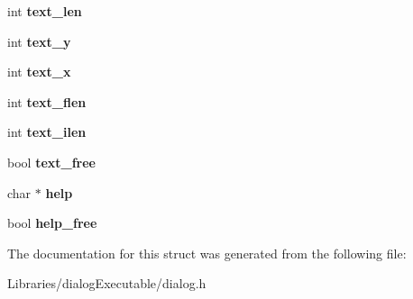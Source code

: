 \begin{DoxyCompactItemize}
\item 
int {\bfseries text\+\_\+len}\hypertarget{struct_d_i_a_l_o_g___f_o_r_m_i_t_e_m_a0e112e1cc3d865c15ebdc427cae71762}{}\label{struct_d_i_a_l_o_g___f_o_r_m_i_t_e_m_a0e112e1cc3d865c15ebdc427cae71762}

\item 
int {\bfseries text\+\_\+y}\hypertarget{struct_d_i_a_l_o_g___f_o_r_m_i_t_e_m_a95d22fda88099224259f545d80e4e87a}{}\label{struct_d_i_a_l_o_g___f_o_r_m_i_t_e_m_a95d22fda88099224259f545d80e4e87a}

\item 
int {\bfseries text\+\_\+x}\hypertarget{struct_d_i_a_l_o_g___f_o_r_m_i_t_e_m_a8341a3902620a26450745b718cfb738c}{}\label{struct_d_i_a_l_o_g___f_o_r_m_i_t_e_m_a8341a3902620a26450745b718cfb738c}

\item 
int {\bfseries text\+\_\+flen}\hypertarget{struct_d_i_a_l_o_g___f_o_r_m_i_t_e_m_a98bec5d330f043b6b9e28a07aa527432}{}\label{struct_d_i_a_l_o_g___f_o_r_m_i_t_e_m_a98bec5d330f043b6b9e28a07aa527432}

\item 
int {\bfseries text\+\_\+ilen}\hypertarget{struct_d_i_a_l_o_g___f_o_r_m_i_t_e_m_aa45b0f3608d9a0122a6ec12cac0534e5}{}\label{struct_d_i_a_l_o_g___f_o_r_m_i_t_e_m_aa45b0f3608d9a0122a6ec12cac0534e5}

\item 
bool {\bfseries text\+\_\+free}\hypertarget{struct_d_i_a_l_o_g___f_o_r_m_i_t_e_m_a21f51adc6f96aae877941eb25896d2b6}{}\label{struct_d_i_a_l_o_g___f_o_r_m_i_t_e_m_a21f51adc6f96aae877941eb25896d2b6}

\item 
char $\ast$ {\bfseries help}\hypertarget{struct_d_i_a_l_o_g___f_o_r_m_i_t_e_m_a792e36095653412101776ed5c3835814}{}\label{struct_d_i_a_l_o_g___f_o_r_m_i_t_e_m_a792e36095653412101776ed5c3835814}

\item 
bool {\bfseries help\+\_\+free}\hypertarget{struct_d_i_a_l_o_g___f_o_r_m_i_t_e_m_a0390a1f0f52f0d33dd927faf1681e9a0}{}\label{struct_d_i_a_l_o_g___f_o_r_m_i_t_e_m_a0390a1f0f52f0d33dd927faf1681e9a0}

\end{DoxyCompactItemize}


The documentation for this struct was generated from the following file\+:\begin{DoxyCompactItemize}
\item 
Libraries/dialog\+Executable/dialog.\+h\end{DoxyCompactItemize}
